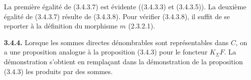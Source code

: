 \clearpage
{}%
\begingroup
\small

La première égalité de (3.4.3.7) est évidente ((3.4.3.3) et
(3.4.3.5)). La deuxième égalité de (3.4.3.7) résulte de (3.4.3.8).
Pour vérifier (3.4.3.8), il suffit de se reporter à la définition du
morphisme $m$ (2.3.2.1).

\noindent\textbf{3.4.4.}\quad
Lorsque les sommes directes dénombrables sont représentables dans $C$, on a
une proposition analogue à la proposition (3.4.3) pour le foncteur
$K_{\Sigma}F$. La démonstration s'obtient en remplaçant dans la démonstration
de la proposition (3.4.3) les produits par des sommes.
\endgroup
